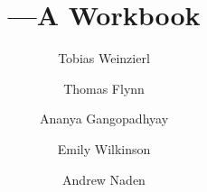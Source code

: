 \title{\booktitle---A Workbook}
\author{Tobias Weinzierl \and Thomas Flynn \and Ananya Gangopadhyay \and Emily Wilkinson \and Andrew Naden}
